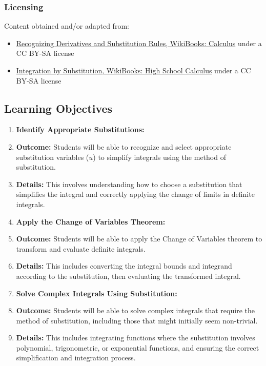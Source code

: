 \subsubsection{Licensing}
\label{sss:lice-7352}


Content obtained and/or adapted from:


\begin{itemize}
    \item \href{https://en.wikibooks.org/wiki/Calculus/Integration_techniques/Recognizing_Derivatives_and_the_Substitution_Rule}{Recognizing Derivatives and Substitution Rules, WikiBooks: Calculus} under a CC BY-SA license
    \item \href{https://en.wikibooks.org/wiki/High_School_Calculus/Integration_by_Substitution}{Integration by Substitution, WikiBooks: High School Calculus} under a CC BY-SA license
\end{itemize}

\subsection{Learning Objectives}

\begin{enumerate}
    \item \textbf{Identify Appropriate Substitutions:}
    \item \textbf{Outcome:} Students will be able to recognize and select appropriate substitution variables ($u$) to simplify integrals using the method of substitution.
    \item \textbf{Details:} This involves understanding how to choose a substitution that simplifies the integral and correctly applying the change of limits in definite integrals.
    \item \textbf{Apply the Change of Variables Theorem:}
    \item \textbf{Outcome:} Students will be able to apply the Change of Variables theorem to transform and evaluate definite integrals.
    \item \textbf{Details:} This includes converting the integral bounds and integrand according to the substitution, then evaluating the transformed integral.
    \item \textbf{Solve Complex Integrals Using Substitution:}
    \item \textbf{Outcome:} Students will be able to solve complex integrals that require the method of substitution, including those that might initially seem non-trivial.
    \item \textbf{Details:} This includes integrating functions where the substitution involves polynomial, trigonometric, or exponential functions, and ensuring the correct simplification and integration process.
\end{enumerate}

